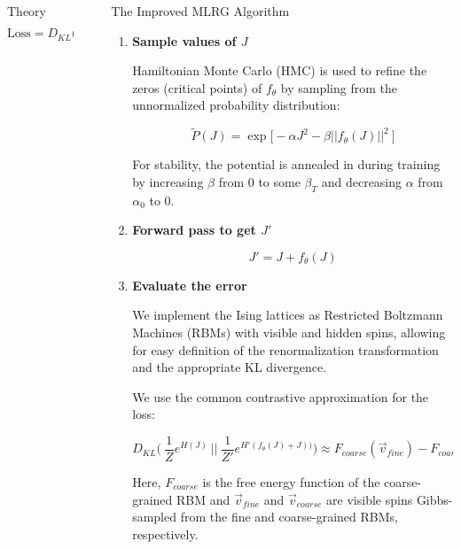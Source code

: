 \documentclass{beamer}
\newlength{\sepwidth}
\newlength{\colwidth}
\newcommand{\separatorcolumn}{\begin{column}{\sepwidth}\end{column}}
\begin{document}
\begin{frame}[t]
\begin{columns}[t]
\begin{column}{\colwidth}
\begin{block}{Theory}
    \[
    \text{Loss} = D_{KL} \bigg( \: \frac{1}{Z} e^{H(J)} \: \bigg|\bigg| \:\frac{1}{Z'} e^{H'(f_\theta(J) + J))}\bigg)
    \]

    \end{block}

\end{column}

\separatorcolumn

\begin{column}{\colwidth}

    \begin{block}{The Improved MLRG Algorithm}
        \begin{enumerate}
            \item{
                \textbf{Sample values of $J$}
        
                Hamiltonian Monte Carlo (HMC) \cite{betancourt-hmc, duane-hmc} is used to refine the zeros (critical points) of $f_\theta$ by sampling from the unnormalized probability distribution:
                
                \[
                    \tilde{P}(J) = \exp \big[- \alpha J ^2 - \beta || f_\theta(J) ||^2 \: \big]
                \]
                
                For stability, the potential is annealed in during training by increasing $\beta$ from $0$ to some $\beta_T$ and decreasing $\alpha$ from $\alpha_0$ to $0$. 
            }
            \item{
                \textbf{Forward pass to get $J'$}
                
                \[
                J' = J + f_\theta(J)
                \]
            }
            \item {
                \textbf{Evaluate the error}
        
                We implement the Ising lattices as Restricted Boltzmann Machines (RBMs) with visible and hidden spins, allowing for easy definition of the renormalization transformation and the appropriate KL divergence. 
                
                We use the common contrastive approximation for the loss:
                
                \[
                    D_{KL} \bigg( \: \frac{1}{Z} e^{H(J)} \: \bigg|\bigg| \:\frac{1}{Z'} e^{H'(f_\theta(J) + J))}\bigg) \approx F_{coarse}(\vec{v}_{fine}) - F_{coarse}(\vec{v}_{coarse})
                \]
                
                Here, $F_{coarse}$ is the free energy function of the coarse-grained RBM and $\vec{v}_{fine}$ and $\vec{v}_{coarse}$ are visible spins Gibbs-sampled from the fine and coarse-grained RBMs, respectively. 
            }
            

\end{enumerate}
\end{block}
\end{column}
\end{columns}
\end{frame}
\end{document}
